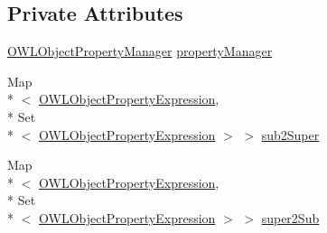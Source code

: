 \subsection*{Private Attributes}
\begin{DoxyCompactItemize}
\item 
\hyperlink{classorg_1_1semanticweb_1_1owlapi_1_1util_1_1_o_w_l_object_property_manager}{O\-W\-L\-Object\-Property\-Manager} \hyperlink{classorg_1_1semanticweb_1_1owlapi_1_1reasoner_1_1structural_1_1_structural_reasoner_1_1_raw_object_property_hierarchy_provider_a73dcf47593212936b5995dc3852906c7}{property\-Manager}
\item 
Map\\*
$<$ \hyperlink{interfaceorg_1_1semanticweb_1_1owlapi_1_1model_1_1_o_w_l_object_property_expression}{O\-W\-L\-Object\-Property\-Expression}, \\*
Set\\*
$<$ \hyperlink{interfaceorg_1_1semanticweb_1_1owlapi_1_1model_1_1_o_w_l_object_property_expression}{O\-W\-L\-Object\-Property\-Expression} $>$ $>$ \hyperlink{classorg_1_1semanticweb_1_1owlapi_1_1reasoner_1_1structural_1_1_structural_reasoner_1_1_raw_object_property_hierarchy_provider_acebc552e7cea61ec00b93dae8d834d43}{sub2\-Super}
\item 
Map\\*
$<$ \hyperlink{interfaceorg_1_1semanticweb_1_1owlapi_1_1model_1_1_o_w_l_object_property_expression}{O\-W\-L\-Object\-Property\-Expression}, \\*
Set\\*
$<$ \hyperlink{interfaceorg_1_1semanticweb_1_1owlapi_1_1model_1_1_o_w_l_object_property_expression}{O\-W\-L\-Object\-Property\-Expression} $>$ $>$ \hyperlink{classorg_1_1semanticweb_1_1owlapi_1_1reasoner_1_1structural_1_1_structural_reasoner_1_1_raw_object_property_hierarchy_provider_a9df6fac71b291254dc58641b7b0f0edc}{super2\-Sub}
\end{DoxyCompactItemize}



